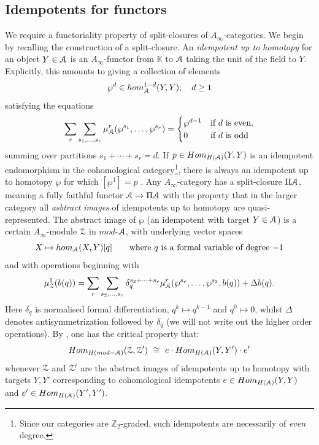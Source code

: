 \documentclass[reqno,10pt]{amsart}
\numberwithin{equation}{section}
\newcommand{\bK}{{\mathbb K}}
\newcommand{\bZ}{{\mathbb Z}}
\newcommand{\scrZ}{\EuScript{Z}}
\newcommand{\scrA}{\EuScript{A}}
\theoremstyle{remark}
\begin{document}
\subsection{Idempotents for functors\label{Section:AlgebraicInterlude}}

We require a functoriality property of split-closures of $A_{\infty}$-categories.  We begin by recalling the construction of a split-closure.  An \emph{idempotent up to homotopy} for an object $Y\in\scrA$ is an $A_{\infty}$-functor from $\bK$ to $\scrA$ taking the unit of the field to $Y$.  Explicitly, this amounts to giving a collection of elements
 \[
 \wp^d \in hom_{\scrA}^{1-d}(Y,Y); \quad d\geq 1
 \]
 satisfying the equations
 \begin{equation} \label{Eq:idempotent-up-to-homotopy}
 \sum_r \sum_{s_1,\ldots, s_r} \mu_{\scrA}^r(\wp^{s_1},\ldots,\wp^{s_r}) = \begin{cases} \wp^{d-1} & \textrm{if $d$ is even}, \\ 0 & \textrm{if $d$ is odd} \end{cases}
 \end{equation}
summing over partitions $s_1+\cdots+s_r=d$.  If $p\in Hom_{H(\scrA)}(Y,Y)$ is an idempotent endomorphism in the cohomological category\footnote{Since our categories are $\bZ_2$-graded, such idempotents are necessarily of \emph{even} degree.}, there is always an idempotent up to homotopy $\wp$ for which $[\wp^1]=p$ \cite[Lemma 4.2]{FCPLT}.  Any $A_{\infty}$-category has a split-closure $\Pi\scrA$, meaning a fully faithful functor $\scrA \rightarrow \Pi\scrA$ with the property that in the larger category all \emph{asbtract images} of idempotents up to homotopy are quasi-represented.  The abstract image of $\wp$ (an idempotent with target $Y \in \scrA$) is a certain $A_{\infty}$-module $\scrZ$ in $mod$-$\scrA$, with underlying vector spaces
\[
X \mapsto hom_{\scrA}(X,Y)[q] \qquad \text{where $q$ is a formal variable of degree $-1$}
\]
and with operations beginning with
\[
\mu_{\scrZ}^1(b(q)) = \sum _r \sum_{s_2,\ldots, s_r} \delta_q^{s_2 + \cdots + s_r} \mu_{\scrA}^r (\wp^{s_r},\ldots, \wp^{s_2}, b(q)) + \Delta b(q).
\]
Here $\delta_q$ is normalised formal differentiation, $q^k \mapsto q^{k-1}$ and $q^0 \mapsto 0$, whilst $\Delta$ denotes antisymmetrization followed by $\delta_q$ (we will not write out the higher order operations). By \cite[Lemma 4.5]{FCPLT}, one has the critical property that:
\begin{equation} \label{Eq:AbstractIdempotentModules}
Hom_{H(mod-\scrA)}(\scrZ,\scrZ') \ \cong \ e\cdot Hom_{H(\scrA)}(Y,Y')\cdot e'
\end{equation}
whenever $\scrZ$ and $\scrZ'$ are the abstract images of idempotents up to homotopy with targets $Y,Y'$ corresponding to cohomological idempotents $e\in Hom_{H(\scrA)}(Y,Y)$ and $e' \in Hom_{H(\scrA)}(Y', Y')$.
\end{document}
